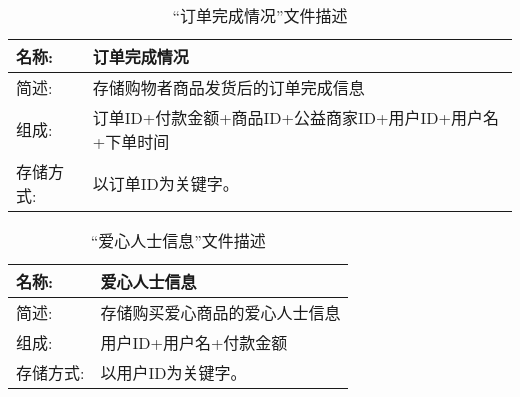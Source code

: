 \begin{table}[H]  
\caption{``订单完成情况”文件描述}  
\begin{center}  
    \begin{tabular}{l p{11cm}} 
        \hline
        \quad 名称:  &   订单完成情况 \\
        \hline
        \quad 简述:  & 存储购物者商品发货后的订单完成信息\\
        \hline
        \quad 组成:  & 订单ID+付款金额+商品ID+公益商家ID+用户ID+用户名+下单时间 \\
        \hline
        \quad 存储方式:  & 以订单ID为关键字。 \\
        \hline
    \end{tabular}
    \label{tab1}
\end{center}
\end{table}

\begin{table}[H]  
\caption{``爱心人士信息”文件描述}  
\begin{center}  
    \begin{tabular}{l p{11cm}} 
        \hline
        \quad 名称:  &   爱心人士信息 \\
        \hline
        \quad 简述:  & 存储购买爱心商品的爱心人士信息\\
        \hline
        \quad 组成:  & 用户ID+用户名+付款金额 \\
        \hline
        \quad 存储方式:  & 以用户ID为关键字。 \\
        \hline
    \end{tabular}
    \label{tab1}
\end{center}
\end{table}
